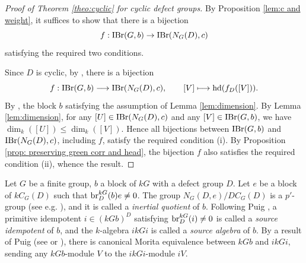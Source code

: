 \documentclass[preprint,12pt,3p]{elsarticle}
\def\IBr{{\rm IBr}}
\def\br{{\rm br}}
\def\hd{{\rm hd}}
\begin{document}



\begin{proof}[Proof of Theorem \ref{theo:cyclic} for cyclic defect groups]
By Proposition \ref{lem:c and weight}, it suffices to show that there is a bijection
$$f:\IBr(G,b)\to\IBr(N_G(D),c)$$
satisfying the required two conditions.

Since $D$ is cyclic, by \cite[Lemma~4.1]{KS}, there is a bijection
$$f:\IBr(G,b)\longrightarrow\IBr(N_G(D),c), \qquad [V] \longmapsto \hd(f_D([V])).$$
By \cite[Theorem 11.1.1]{Lin18b}, the block $b$ satisfying the assumption of Lemma \ref{lem:dimension}. By Lemma \ref{lem:dimension}, for any $[U]\in \IBr(N_G(D),c)$ and any $[V]\in \IBr(G,b)$, we have $\dim_k([U])\leq \dim_k([V])$. Hence all bijections between $\IBr(G,b)$ and $\IBr(N_G(D),c)$, including $f$, satisfy the required condition (i).
By Proposition \ref{prop: preserving green corr and head}, the bijection $f$ also satisfies the required condition (ii), whence the result. 
\end{proof}


Let $G$ be a finite group, $b$ a block of $kG$ with a defect group $D$. Let $e$ be a block of $kC_G(D)$ such that $\br_D^{kG}(b)e\neq 0$. The group $N_G(D,e)/DC_G(D)$ is a $p'$-group (see e.g. \cite[Theorem 6.7.6 (v)]{Lin18b}), and it is called a {\it inertial quotient} of $b$. Following Puig \cite[Definition 3.2]{Puig81}, a primitive idempotent $i\in(kGb)^D$ satisfying $\br_D^{kG}(i)\neq 0$ is called a {\it source idempotent} of $b$, and the $k$-algebra $ikGi$ is called a {\it source algebra} of $b$. By a result of Puig (see \cite[Corollary 3.5]{Puig81} or \cite[Theorem 6.4.6]{Lin18b}), there is canonical Morita equivalence between $kGb$ and $ikGi$, sending any $kGb$-module $V$ to the $ikGi$-module $iV$. %
\end{document}

